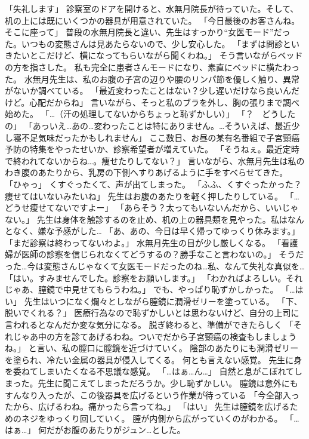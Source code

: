 「失礼します」
診察室のドアを開けると、水無月院長が待っていた。そして、机の上には既にいくつかの器具が用意されていた。
「今日最後のお客さんね。そこに座って」
普段の水無月院長と違い、先生はすっかり“女医モード”だった。いつもの変態さんは見あたらないので、少し安心した。
「まずは問診といきたいとこだけど、横になってもらいながら聞くわね。」
そう言いながらベッドの方を指さした。
私も完全に患者さんモードになり、素直にベッドに横たわった。
水無月先生は、私のお腹の子宮の辺りや腰のリンパ節を優しく触り、異常がないか調べている。
「最近変わったことはない？少し遅いだけなら良いんだけど。心配だからね」
言いながら、そっと私のブラを外し、胸の張りまで調べ始めた。
「…（汗の処理してないからちょっと恥ずかしい）」
「？　どうしたの」
「あっいえ…あの…変わったことは特にありません。…そういえば、最近少し寝不足気味だったかもしれません」
ここ数日、お昼の某有名番組で子宮頸癌予防の特集をやったせいか、診察希望者が増えていた。
「そうねぇ。最近定時で終われてないからね…。痩せたりしてない？」
言いながら、水無月先生は私のわき腹のあたりから、乳房の下側へすりあげるように手をすべらせてきた。
「ひゃっ」
くすぐったくて、声が出てしまった。
「ふふ、くすぐったかった？痩せてはいないみたいね」
先生はお腹のあたりを軽く押したりしている。
「…どうせ痩せてないですよー」
「あらそう？太ってもいないんだから、いいじゃない。」
先生は身体を触診するのを止め、机の上の器具類を見やった。私はなんとなく、嫌な予感がした…
「あ、あの、今日は早く帰ってゆっくり休みます。」
「まだ診察は終わってないわよ。」
水無月先生の目が少し厳しくなる。
「看護婦が医師の診察を信じられなくてどうするの？勝手なこと言わないの。」
そうだった…今は変態さんじゃなくて女医モードだったのね…私、なんて失礼な真似を…
「はい。すみませんでした。診察をお願いします。」
「わかればよろしい。それじゃあ、膣鏡で中見せてもらうわね。」
でも、やっぱり恥ずかしかった。
「…はい」
先生はいつになく爛々としながら膣鏡に潤滑ゼリーを塗っている。
「下、脱いでくれる？」
医療行為なので恥ずかしいとは思わないけど、自分の上司に言われるとなんだか変な気分になる。
脱ぎ終わると、準備ができたらしく
「それじゃあ中の方を診てあげるわね。ついでだから子宮頸癌の検査もしましょうね。」
と言い、私の膣口に膣鏡を近づけていく。
陰部のあたりにも潤滑ゼリーを塗られ、冷たい金属の器具が侵入してくる。
何とも言えない感覚。
先生に身を委ねてしまいたくなる不思議な感覚。
「…はぁ…ん…」
自然と息がこぼれてしまった。先生に聞こえてしまっただろうか。少し恥ずかしい。
膣鏡は意外にもすんなり入ったが、この後器具を広げるという作業が待っている
「今全部入ったから、広げるわね。痛かったら言ってね。」
「はい」
先生は膣鏡を広げるためのネジをゆっくり回していく。
膣が内側から広がっていくのがわかる。
「…はぁ…」
何だがお腹のあたりがジュン…とした。
